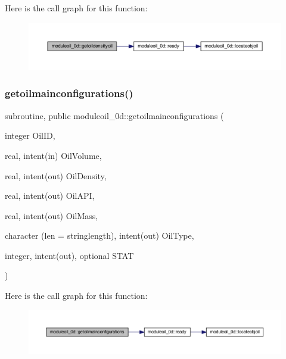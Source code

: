 Here is the call graph for this function\+:\nopagebreak
\begin{figure}[H]
\begin{center}
\leavevmode
\includegraphics[width=350pt]{namespacemoduleoil__0d_ab2e737cc90063238a3eedf443bd6b593_cgraph}
\end{center}
\end{figure}
\mbox{\label{namespacemoduleoil__0d_af1cdc5385033828e9fd0e86082d2c7f3}} 
\subsubsection{\texorpdfstring{getoilmainconfigurations()}{getoilmainconfigurations()}}
{\footnotesize\ttfamily subroutine, public moduleoil\+\_\+0d\+::getoilmainconfigurations (\begin{DoxyParamCaption}\item[{integer}]{Oil\+ID,  }\item[{real, intent(in)}]{Oil\+Volume,  }\item[{real, intent(out)}]{Oil\+Density,  }\item[{real, intent(out)}]{Oil\+A\+PI,  }\item[{real, intent(out)}]{Oil\+Mass,  }\item[{character (len = stringlength), intent(out)}]{Oil\+Type,  }\item[{integer, intent(out), optional}]{S\+T\+AT }\end{DoxyParamCaption})}

Here is the call graph for this function\+:\nopagebreak
\begin{figure}[H]
\begin{center}
\leavevmode
\includegraphics[width=350pt]{namespacemoduleoil__0d_af1cdc5385033828e9fd0e86082d2c7f3_cgraph}
\end{center}
\end{figure}
\mbox{\label{namespacemoduleoil__0d_a76e417f6fa89172bc195c9dca9d10dc7}} 
